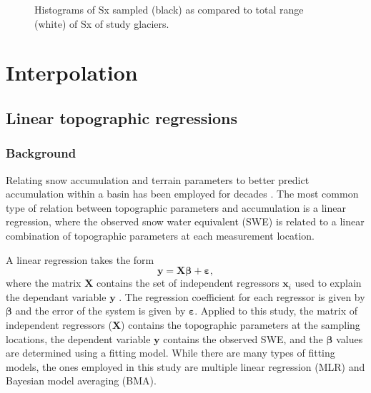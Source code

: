 \documentclass{sfuthesis}
\renewcommand{\vector}[1]{\mathbf{#1}}
\begin{document}
\begin{figure}[H]
	\caption{Histograms of Sx sampled (black) as compared to total range (white) of Sx of study glaciers.}
	\label{sampledRange:Sx}
\end{figure}



\chapter{Interpolation}


\section{Linear topographic regressions}
\label{sec:linearregression}

\subsection{Background}
Relating snow accumulation and terrain parameters to better predict accumulation within a basin has been employed for decades \citep[e.g.][]{Woo1978, Molotch2005, McGrath2015}. The most common type of relation between topographic parameters and accumulation is a linear regression, where the observed snow water equivalent (SWE) is related to a linear combination of topographic parameters at each measurement location. 

A linear regression takes the form
\begin{equation}
\vector{y} = \vector{X} \bm{\beta} + \bm{\varepsilon},
\end{equation}
where the matrix $\vector{X}$ contains the set of independent regressors $\vector{x}_i$ used to explain the dependant variable $\vector{y}$ \citep[e.g.][]{Davis1986}. The regression coefficient for each regressor is given by $\bm{\beta}$ and the error of the system is given by $\bm{\varepsilon}$. Applied to this study, the matrix of independent regressors ($\vector{X}$) contains the topographic parameters at the sampling locations, the dependent variable $\vector{y}$ contains the observed SWE, and the $\bm{\beta}$ values are determined using a fitting model. While there are many types of fitting models, the ones employed in this study are multiple linear regression (MLR) and Bayesian model averaging (BMA).
\end{document}
